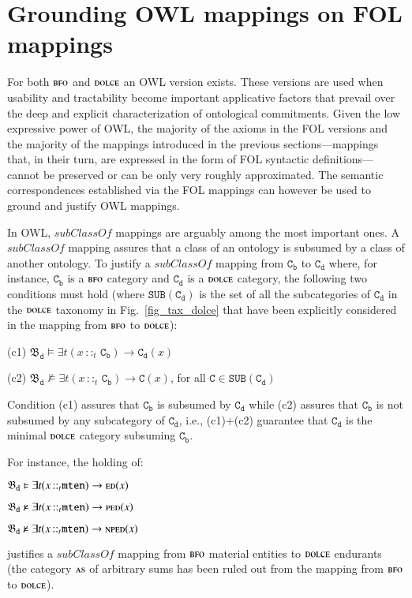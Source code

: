 \documentclass[ao]{iosart2x}
\newcommand{\bflist}{\begin{list}{}{\setlength{\topsep}{2mm}\setlength{\parsep}{0mm}\setlength{\leftmargin}{9.2mm}\setlength{\labelwidth}{8mm}}}
\newcommand{\eflist}{\end{list}}
\newcommand{\pr}[1]{\mathtt{#1}}
\newcommand{\cn}[1]{\mathtt{#1}}
\newcommand{\dolce}{{\textsc{dolce}}}
\newcommand{\bfo}{{\textsc{bfo}}}
\newcommand {\thbfobdmap} {\ensuremath{\mathfrak{B}_\texttt{d}}}
\newcommand {\ASdcat} {\textsc{as}}
\newcommand {\EDdcat} {\textsc{ed}}
\newcommand {\NPEDdcat} {\textsc{nped}}
\newcommand {\PEDdcat} {\textsc{ped}}
\newcommand{\mtenbcat}{\cn{mten}}
\newcommand{\bfoiof}[1]{{\,::_{#1\:\!}}}
\begin{document}
\section{Grounding OWL mappings on FOL mappings}\label{sect_FOL_OWL}

For both $\bfo$ and $\dolce$ an OWL version exists. These versions are used when usability and tractability become important applicative factors that prevail over the deep and explicit characterization of ontological commitments. Given the low expressive power of OWL, the majority of the axioms in the FOL versions and the majority of the mappings introduced in the previous sections---mappings that, in their turn, are expressed in the form of FOL syntactic definitions---cannot be preserved or can be only very roughly approximated. The semantic correspondences established via the FOL mappings can however be used to {ground} and justify OWL mappings.

In OWL, $\mathit{subClassOf}$ mappings are arguably among the most important ones. A $\mathit{subClassOf}$ mapping assures that a class of an ontology is subsumed by a class of another ontology. To justify a $\mathit{subClassOf}$ mapping from $\pr{C_b}$ to $\pr{C_d}$ where, for instance, $\pr{C_b}$ is a $\bfo$ category and $\pr{C_d}$ is a $\dolce$ category, the following two conditions must hold (where $\pr{SUB}(\pr{C_d})$ is the set of all the subcategories of $\pr{C_d}$ in the $\dolce$ taxonomy in Fig.~\ref{fig_tax_dolce} that have been explicitly considered in the mapping from $\bfo$ to $\dolce$):
\bflist
\item[(c1)] $\thbfobdmap \vDash \exists t(x \bfoiof{t} \cn{C_b}) \to \pr{C_d}(x)$ 
\item[(c2)] $\thbfobdmap \nvDash \exists t(x \bfoiof{t}  \cn{C_b}) \to \pr{C}(x)$, for all $\pr{C} \in \pr{SUB}(\pr{C_d})$ 
\eflist
%
Condition (c1) assures that $\pr{C_b}$ is subsumed by $\pr{C_d}$ while (c2) assures that $\pr{C_b}$ is not subsumed by any subcategory of $\pr{C_d}$, i.e., (c1)+(c2) guarantee that $\pr{C_d}$ is the minimal $\dolce$ category subsuming $\pr{C_b}$.  

For instance, the holding of:
%
\bflist
\item[] $\thbfobdmap \vDash \exists t(x \bfoiof{t} \mtenbcat) \to \EDdcat(x)$ 
\item[] $\thbfobdmap \nvDash \exists t(x \bfoiof{t} \mtenbcat) \to \PEDdcat(x)$ 
\item[] $\thbfobdmap \nvDash \exists t(x \bfoiof{t} \mtenbcat) \to \NPEDdcat(x)$ 
\eflist
justifies a $\mathit{subClassOf}$ mapping from $\bfo$ material entities to $\dolce$ endurants (the category $\ASdcat$ of arbitrary sums has been ruled out from the mapping from $\bfo$ to $\dolce$). 
\end{document}
